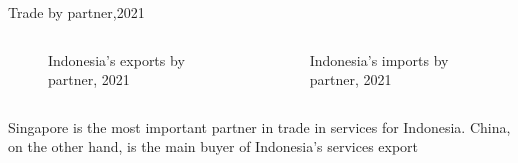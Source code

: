 \documentclass[
  ignorenonframetext,
]{beamer}
\begin{document}
\begin{frame}{Trade by partner,2021}
\label{trade-by-partner2021}
\begin{columns}[T]
\begin{column}{0.47\textwidth}
\begin{figure}


\caption{\label{fig-CX}Indonesia's exports by partner, 2021}

\end{figure}%
\end{column}

\begin{column}{0.47\textwidth}
\begin{figure}


\caption{\label{fig-CM}Indonesia's imports by partner, 2021}

\end{figure}%
\end{column}
\end{columns}

Singapore is the most important partner in trade in services for
Indonesia. China, on the other hand, is the main buyer of Indonesia's
services export
\end{frame}
\end{document}
